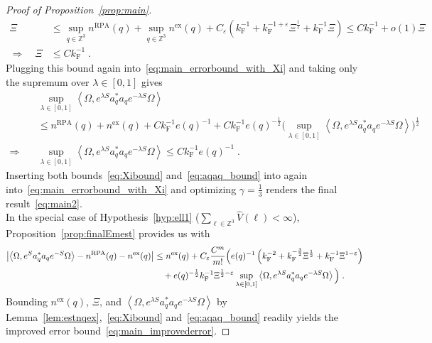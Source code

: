 \documentclass[12pt,a4paper]{article}
\numberwithin{equation}{section}
\newcommand{\1}{\mathbb{I}}
\newcommand{\ex}{\mathrm{ex}}
\newcommand{\F}{\mathrm{F}}
\newcommand{\RPA}{\mathrm{RPA}}
\newcommand{\Zstar}{\mathbb{Z}^3} %
\newcommand{\Z}{\mathbb{Z}}
\newcommand{\half}{\frac{1}{2}}
\newcommand{\eva}[1]{\left\langle #1 \right\rangle}
\theoremstyle{plain}
\theoremstyle{definition}
\theoremstyle{remark}
\theoremstyle{plain}
\theoremstyle{definition}
\theoremstyle{remark}
\begin{document}
\begin{proof}[Proof of Proposition~\ref{prop:main}]
\begin{align} \label{eq:Xibound}
	\Xi
	&\le \sup_{q \in \Z^3} n^{\RPA}(q)
		+ \sup_{q \in \Z^3} n^{\ex}(q)
		+ C_\varepsilon \left( k_{\F}^{-1}
		+ k_{\F}^{-1 + \varepsilon} \Xi^\half
		+ k_{\F}^{-1} \Xi \right)
	\le C k_{\F}^{-1} + o(1) \Xi \nonumber\\
	\Rightarrow \quad
	\Xi
	& \le C k_{\F}^{-1} \;.
\end{align}
Plugging this bound again into~\eqref{eq:main_errorbound_with_Xi} and taking only the supremum over $ \lambda \in [0,1] $ gives
\begin{align} \label{eq:aqaq_bound}
	&\sup_{\lambda \in [0,1]} \eva{\Omega, e^{\lambda S} a_q^* a_q e^{-\lambda S} \Omega} \nonumber\\
	&\le n^{\RPA}(q) + n^{\ex}(q) + C k_{\F}^{-1} e(q)^{-1}
		+ C k_{\F}^{-1} e(q)^{-\half} \Big(\sup_{\lambda \in [0,1]} \eva{\Omega, e^{\lambda S} a_q^* a_q e^{-\lambda S} \Omega} \Big)^{\half} \nonumber\\
	\Rightarrow \quad
	&\sup_{\lambda \in [0,1]} \eva{\Omega, e^{\lambda S} a_q^* a_q e^{-\lambda S} \Omega}
	\le C k_{\F}^{-1} e(q)^{-1} \;.
\end{align}
Inserting both bounds~\eqref{eq:Xibound} and~\eqref{eq:aqaq_bound} into again into~\eqref{eq:main_errorbound_with_Xi} and optimizing $ \gamma = \frac 13 $ renders the final result~\eqref{eq:main2}.\\

In the special case of Hypothesis~\ref{hyp:ell1} ($ \sum_{\ell \in \Zstar} \hat{V}(\ell) < \infty $), Proposition~\ref{prop:finalEmest} provides us with
\begin{align} \label{eq:main_errorbound_with_Xi_subcoulomb}
	\abs{\eva{\Omega, e^{S} a_q^* a_q e^{-S} \Omega} - n^{\textnormal{RPA}}(q) - n^{\ex}(q)}
	&\le n^{\ex}(q) + C_\varepsilon \frac{C^m}{m!}
		\Big( e(q)^{-1} \left( k_{\F}^{-2}
		+ k_{\F}^{-\frac{3}{2}} \Xi^\half
		+ k_{\F}^{-1} \Xi^{1-\varepsilon} \right) \nonumber\\
	&\quad + e(q)^{-\half} k_{\F}^{-1} \Xi^{\half - \varepsilon} \sup_{\lambda \in [0,1]} \eva{\Omega, e^{\lambda S} a_q^* a_q e^{-\lambda S} \Omega} \Big) \;.
\end{align}
Bounding $ n^{\ex}(q) $, $ \Xi $, and $ \eva{\Omega, e^{\lambda S} a_q^* a_q e^{-\lambda S} \Omega} $ by Lemma~\ref{lem:estnqex},~\eqref{eq:Xibound} and~\eqref{eq:aqaq_bound} readily yields the improved error bound~\eqref{eq:main_improvederror}.
\end{proof}
\end{document}
